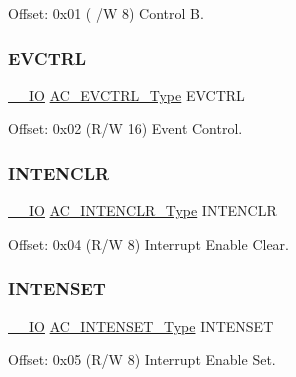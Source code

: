 Offset\+: 0x01 ( /W 8) Control B. 

\mbox{\label{struct_ac_a321f3540f3ac416a80a108404610685d}} 
\subsubsection{\texorpdfstring{EVCTRL}{EVCTRL}}
{\footnotesize\ttfamily \mbox{\hyperlink{core__cm0plus_8h_aec43007d9998a0a0e01faede4133d6be}{\+\_\+\+\_\+\+IO}} \mbox{\hyperlink{union_a_c___e_v_c_t_r_l___type}{A\+C\+\_\+\+E\+V\+C\+T\+R\+L\+\_\+\+Type}} E\+V\+C\+T\+RL}



Offset\+: 0x02 (R/W 16) Event Control. 

\mbox{\label{struct_ac_a8aaec35ee2c80cf37cb569c95943d6ea}} 
\subsubsection{\texorpdfstring{INTENCLR}{INTENCLR}}
{\footnotesize\ttfamily \mbox{\hyperlink{core__cm0plus_8h_aec43007d9998a0a0e01faede4133d6be}{\+\_\+\+\_\+\+IO}} \mbox{\hyperlink{union_a_c___i_n_t_e_n_c_l_r___type}{A\+C\+\_\+\+I\+N\+T\+E\+N\+C\+L\+R\+\_\+\+Type}} I\+N\+T\+E\+N\+C\+LR}



Offset\+: 0x04 (R/W 8) Interrupt Enable Clear. 

\mbox{\label{struct_ac_af5a18bdc138524da112c6bb4eb555cc0}} 
\subsubsection{\texorpdfstring{INTENSET}{INTENSET}}
{\footnotesize\ttfamily \mbox{\hyperlink{core__cm0plus_8h_aec43007d9998a0a0e01faede4133d6be}{\+\_\+\+\_\+\+IO}} \mbox{\hyperlink{union_a_c___i_n_t_e_n_s_e_t___type}{A\+C\+\_\+\+I\+N\+T\+E\+N\+S\+E\+T\+\_\+\+Type}} I\+N\+T\+E\+N\+S\+ET}



Offset\+: 0x05 (R/W 8) Interrupt Enable Set. 

\mbox{\label{struct_ac_a9e9530621ea55d1c50564568ea2938c5}} 
